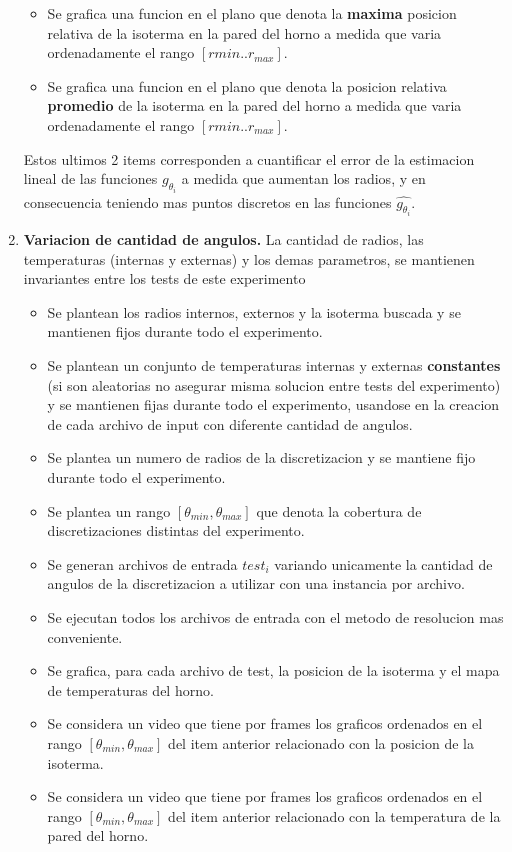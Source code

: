 \begin{enumerate}
\begin{itemize}
        \item Se grafica una funcion en el plano que denota la \textbf{maxima} posicion relativa de la isoterma en la pared del horno a medida que varia ordenadamente el rango $[r{min}..r_{max}]$.
        \item Se grafica una funcion en el plano que denota la posicion relativa \textbf{promedio} de la isoterma en la pared del horno a medida que varia ordenadamente el rango $[r{min}..r_{max}]$.
    \end{itemize}  Estos ultimos 2 items corresponden a cuantificar el error de la estimacion lineal de las funciones $g_{\theta_i}$ a medida que aumentan los radios, y en consecuencia teniendo mas puntos discretos en las funciones $\hat{g_{\theta_i}}$.

    \item \textbf{Variacion de cantidad de angulos.} La cantidad de radios, las temperaturas (internas y externas) y los demas parametros, se mantienen invariantes entre los tests de este experimento\begin{itemize}
        \item Se plantean los radios internos, externos y la isoterma buscada y se mantienen fijos durante todo el experimento.
        \item Se plantean un conjunto de temperaturas internas y externas \textbf{constantes} (si son aleatorias no asegurar misma solucion entre tests del experimento) y se mantienen fijas durante todo el experimento, usandose en la creacion de cada archivo de input con diferente cantidad de angulos.
        \item Se plantea un numero de radios de la discretizacion y se mantiene fijo durante todo el experimento. 
        \item Se plantea un rango $[\theta_{min}, \theta_{max}]$ que denota la cobertura de discretizaciones distintas del experimento.
        \item Se generan archivos de entrada $test_i$ variando unicamente la cantidad de angulos de la discretizacion a utilizar con una instancia por archivo.
        \item Se ejecutan todos los archivos de entrada con el metodo de resolucion mas conveniente.
        \item Se grafica, para cada archivo de test, la posicion de la isoterma y el mapa de temperaturas del horno.
        \item Se considera un video que tiene por frames los graficos ordenados en el rango $[\theta_{min}, \theta_{max}]$ del item anterior relacionado con la posicion de la isoterma.
        \item Se considera un video que tiene por frames los graficos ordenados en el rango $[\theta_{min}, \theta_{max}]$ del item anterior relacionado con la temperatura de la pared del horno.
    \end{itemize}    


\end{enumerate}
